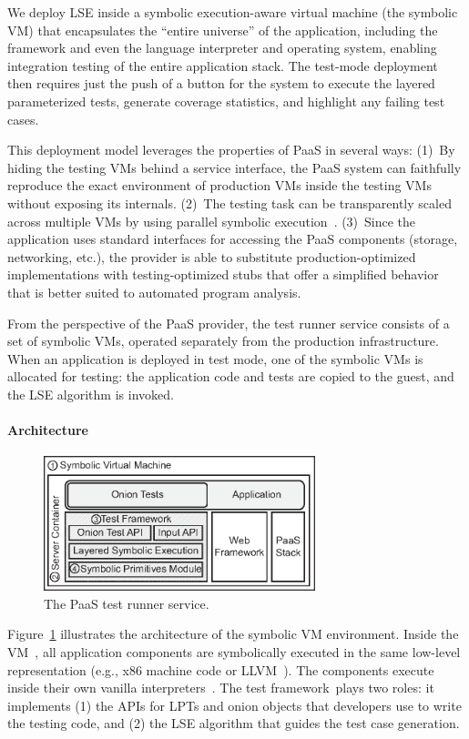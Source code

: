 We deploy LSE inside a symbolic execution-aware virtual machine (the symbolic VM) that encapsulates the ``entire universe'' of the application, including the framework and even the language interpreter and operating system, enabling integration testing of the entire application stack.
%
The test-mode deployment then requires just the push of a button for the system to execute the layered parameterized tests, generate coverage statistics, and highlight any failing test cases.

This deployment model leverages the properties of PaaS in several
ways:
%
(1)~By hiding the testing VMs behind a service interface, the PaaS system can faithfully reproduce the exact environment of production VMs inside the testing VMs without exposing its internals.
%
(2)~The testing task can be transparently scaled across multiple VMs
by using parallel symbolic execution~\cite{cloud9}.
%
(3)~Since the application uses standard interfaces for accessing the PaaS components (storage, networking, etc.), the provider is able to substitute production-optimized implementations with testing-optimized stubs that offer a simplified behavior that is better suited to automated program analysis.

From the perspective of the PaaS provider, the test runner service consists of a set of symbolic VMs, operated separately from the production infrastructure.  When an application is deployed in test mode, one of the symbolic VMs is allocated for testing: the application code and tests are copied to the guest, and the LSE algorithm is invoked.

\paragraph{Architecture}

\begin{figure}
  \centering
  \includegraphics[width=3.1in]{paas/figures/symbolic-vm}
  \caption{The PaaS test runner service.}
  \label{fig:fse}
\end{figure}

Figure~\ref{fig:fse} illustrates the architecture of the symbolic VM
environment.  Inside the VM~\cI, all application components are
symbolically executed in the same low-level representation (e.g., x86
machine code or LLVM~\cite{llvm}).  The components execute inside
their own vanilla interpreters~\cII.  
%
The test framework~\cIII plays two roles: it implements (1) the APIs for LPTs and onion objects that developers use to write the testing code, and (2) the LSE algorithm that guides the test case generation.


